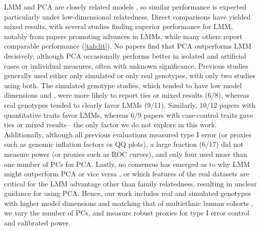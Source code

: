 \documentclass[11pt]{article}
\begin{document}
\begin{linenumbers}
LMM and PCA are closely related models \citep{astle_population_2009, janss_inferences_2012, hoffman_correcting_2013, zhang_principal_2015}, so similar performance is expected particularly under low-dimensional relatedness.
Direct comparisons have yielded mixed results, with several studies finding superior performance for LMM, notably from papers promoting advances in LMMs, while many others report comparable performance (\cref{tab:lit}).
No papers find that PCA outperforms LMM decisively, although PCA occasionally performs better in isolated and artificial cases or individual measures, often with unknown significance.
Previous studies generally used either only simulated or only real genotypes, with only two studies using both.
The simulated genotype studies, which tended to have low model dimensions and \Fst, were more likely to report ties or mixed results (6/8), whereas real genotypes tended to clearly favor LMMs (9/11).
Similarly, 10/12 papers with quantitative traits favor LMMs, whereas 6/9 papers with case-control traits gave ties or mixed results---the only factor we do not explore in this work.
Additionally, although all previous evaluations measured type I error (or proxies such as genomic inflation factors \citep{devlin_genomic_1999} or QQ plots), a large fraction (6/17) did not measure power (or proxies such as ROC curves), and only four used more than one number of PCs for PCA.
Lastly, no consensus has emerged as to why LMM might outperform PCA or vice versa \citep{price_new_2010, sul_mixed_2013, price_response_2013, hoffman_correcting_2013}, or which features of the real datasets are critical for the LMM advantage other than family relatedness, resulting in unclear guidance for using PCA.
Hence, our work includes real and simulated genotypes with higher model dimensions and \Fst matching that of multiethnic human cohorts \citep{ochoa_estimating_2021, ochoa_new_2019}, we vary the number of PCs, and measure robust proxies for type I error control and calibrated power.


\end{linenumbers}
\end{document}
